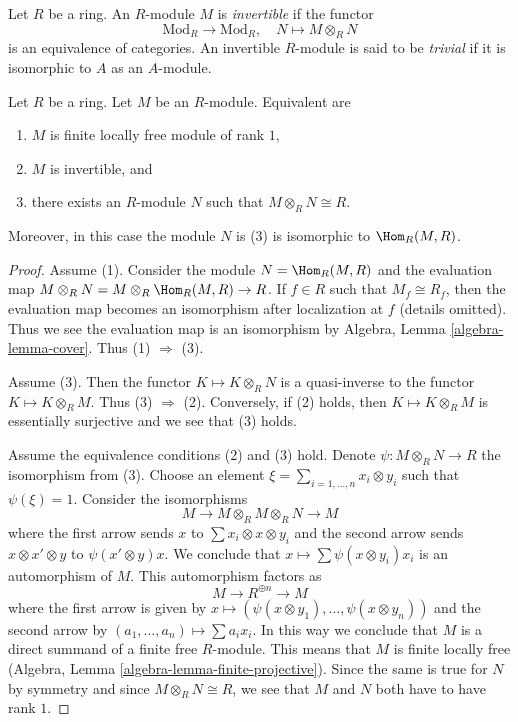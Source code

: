 \begin{definition}
\label{definition-invertible}
Let $R$ be a ring. An $R$-module $M$ is {\it invertible} if the functor
$$
\text{Mod}_R \longrightarrow \text{Mod}_R,\quad
N \longmapsto M \otimes_R N
$$
is an equivalence of categories. An invertible $R$-module is said to be
{\it trivial} if it is isomorphic to $A$ as an $A$-module.
\end{definition}

\begin{lemma}
\label{lemma-invertible}
Let $R$ be a ring. Let $M$ be an $R$-module. Equivalent are
\begin{enumerate}
\item $M$ is finite locally free module of rank $1$,
\item $M$ is invertible, and
\item there exists an $R$-module $N$ such that $M \otimes_R N \cong R$.
\end{enumerate}
Moreover, in this case the module $N$ is (3) is isomorphic
to $\Hom_R(M, R)$.
\end{lemma}

\begin{proof}
Assume (1). Consider the module $N = \Hom_R(M, R)$ and the evaluation
map $M \otimes_R N = M \otimes_R \Hom_R(M, R) \to R$. If $f \in R$
such that $M_f \cong R_f$, then the evaluation map becomes an isomorphism
after localization at $f$ (details omitted). Thus we see the evaluation
map is an isomorphism by Algebra, Lemma \ref{algebra-lemma-cover}.
Thus (1) $\Rightarrow$ (3).

\medskip\noindent
Assume (3). Then the functor $K \mapsto K \otimes_R N$ is a quasi-inverse
to the functor $K \mapsto K \otimes_R M$. Thus (3) $\Rightarrow$ (2).
Conversely, if (2) holds, then $K \mapsto K \otimes_R M$ is essentially
surjective and we see that (3) holds.

\medskip\noindent
Assume the equivalence conditions (2) and (3) hold. Denote
$\psi : M \otimes_R N \to R$ the isomorphism from (3).
Choose an element $\xi = \sum_{i = 1, \ldots, n} x_i \otimes y_i$
such that $\psi(\xi) = 1$. Consider the isomorphisms
$$
M \to M \otimes_R M \otimes_R N \to M
$$
where the first arrow sends $x$ to $\sum x_i \otimes x \otimes y_i$
and the second arrow sends $x \otimes x' \otimes y$ to $\psi(x' \otimes y)x$.
We conclude that $x \mapsto \sum \psi(x \otimes y_i)x_i$ is
an automorphism of $M$. This automorphism factors as
$$
M \to R^{\oplus n} \to M
$$
where the first arrow is given by
$x \mapsto (\psi(x \otimes y_1), \ldots, \psi(x \otimes y_n))$
and the second arrow by $(a_1, \ldots, a_n) \mapsto \sum a_i x_i$.
In this way we conclude that $M$ is a direct summand of a finite free
$R$-module. This means that $M$ is finite locally free
(Algebra, Lemma \ref{algebra-lemma-finite-projective}).
Since the same is true for $N$ by symmetry and since
$M \otimes_R N \cong R$, we see that
$M$ and $N$ both have to have rank $1$.
\end{proof}

